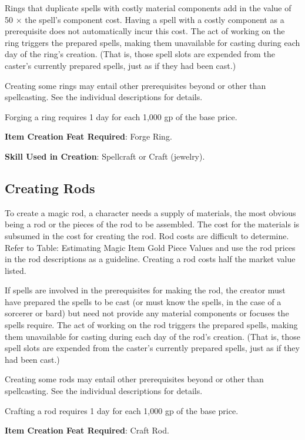 Rings that duplicate spells with costly material components add in the value of 50 \mbox{$\times$} the spell's component cost. Having a spell with a costly component as a prerequisite does not automatically incur this cost. The act of working on the ring triggers the prepared spells, making them unavailable for casting during each day of the ring's creation. (That is, those spell slots are expended from the caster's currently prepared spells, just as if they had been cast.)
				
Creating some rings may entail other prerequisites beyond or other than spellcasting. See the individual descriptions for details.
				
Forging a ring requires 1 day for each 1,000 gp of the base price.
				
\textbf{Item Creation Feat Required}: Forge Ring.
				
\textbf{Skill Used in Creation}: Spellcraft or Craft (jewelry).
				
\subsection{Creating Rods}

				
To create a magic rod, a character needs a supply of materials, the most obvious being a rod or the pieces of the rod to be assembled. The cost for the materials is subsumed in the cost for creating the rod. Rod costs are difficult to determine. Refer to Table: Estimating Magic Item Gold Piece Values and use the rod prices in the rod descriptions as a guideline. Creating a rod costs half the market value listed.
				
If spells are involved in the prerequisites for making the rod, the creator must have prepared the spells to be cast (or must know the spells, in the case of a sorcerer or bard) but need not provide any material components or focuses the spells require. The act of working on the rod triggers the prepared spells, making them unavailable for casting during each day of the rod's creation. (That is, those spell slots are expended from the caster's currently prepared spells, just as if they had been cast.)
				
Creating some rods may entail other prerequisites beyond or other than spellcasting. See the individual descriptions for details.
				
Crafting a rod requires 1 day for each 1,000 gp of the base price.
				
\textbf{Item Creation Feat Required}: Craft Rod.
				
